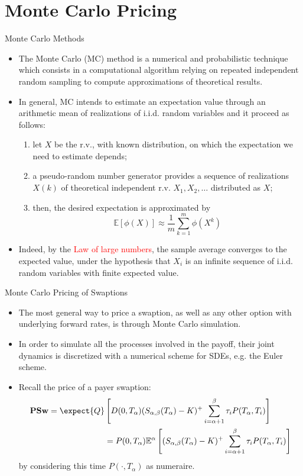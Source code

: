 \documentclass{beamer}
\begin{document}
\section{Monte Carlo Pricing}
\begin{frame}{Monte Carlo Methods}
  \begin{itemize}
  \item<1-> The Monte Carlo (MC) method is a numerical and probabilistic technique which consists in a computational algorithm relying on repeated independent random sampling to compute approximations of theoretical results.
  \item<2-> In general, MC intends to estimate an expectation value through an arithmetic mean of realizations of i.i.d. random variables and it proceed as follows: 
    \begin{enumerate}
    \item let $X$ be the r.v., with known distribution, on which the expectation we need to estimate depends;
    \item a pseudo-random number generator provides a sequence of realizations $X(k)$ of theoretical independent r.v. $X_1, X_2,\ldots$ distributed as $X$;
    \item then, the desired expectation is approximated by
      \begin{equation*}
	\mathbb{E}[\phi(X)] \approx \frac{1}{m}\sum_{k=1}^m\phi(X^k)
      \end{equation*}
    \end{enumerate}
  \item<3-> Indeed, by the \textcolor{red}{Law of large numbers}, the sample average converges to the expected value, under the hypothesis that $X_i$ is an infinite sequence of i.i.d. random variables with finite expected value.
  \end{itemize}
\end{frame}

\begin{frame}{Monte Carlo Pricing of Swaptions}
  \begin{itemize}
  \item<1-> The most general way to price a swaption, as well as any other option with underlying forward rates, is through Monte Carlo simulation. 
  \item<2-> In order to simulate all the processes involved in the payoff, their joint dynamics is discretized with a numerical scheme for SDEs, e.g. the Euler scheme.
  \item<3-> Recall the price of a payer swaption:
    \begin{equation*}
      \begin{aligned}
        \textbf{PSw} = \expect{Q}&\left[D(0, T_\alpha) (S_{\alpha,\beta}(T_\alpha) - K)^+ \sum_{i=\alpha+1}^\beta \tau_i P(T_\alpha, T_i)\right] \\
        &= P(0, T_\alpha)\mathbb{E}^\alpha\left[(S_{\alpha, \beta}(T_\alpha) - K)^+ \sum^\beta_{i=\alpha+1} \tau_i P(T_\alpha, T_i)\right]
      \end{aligned}
    \end{equation*}
    by considering this time $P(\cdot, T_\alpha)$ as numeraire.
  \end{itemize}
\end{frame}
\end{document}
